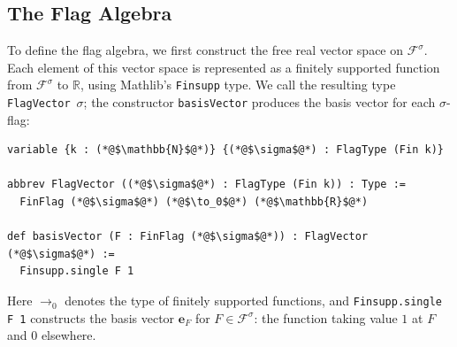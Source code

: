 \documentclass[acmsmall,screen=true,acmthm=false]{acmart}
\DeclareRobustCommand{\lean}[1]{{\def\_{\textunderscore\allowbreak}\texttt{#1}}}
\begin{document}
\subsection{The Flag Algebra}
\label{sec:formal-flag-algebra}

To define the flag algebra, we first construct the free real vector space on
$\mathcal{F}^\sigma$.  Each element of this vector space is represented as a
finitely supported function from $\mathcal{F}^\sigma$ to $\mathbb{R}$, using
Mathlib's \lean{Finsupp} type.  We call the resulting type
\lean{FlagVector}~$\sigma$; the constructor \lean{basisVector} produces the
basis vector for each $\sigma$-flag:
\begin{lstlisting}
variable {k : (*@$\mathbb{N}$@*)} {(*@$\sigma$@*) : FlagType (Fin k)}

abbrev FlagVector ((*@$\sigma$@*) : FlagType (Fin k)) : Type :=
  FinFlag (*@$\sigma$@*) (*@$\to_0$@*) (*@$\mathbb{R}$@*)

def basisVector (F : FinFlag (*@$\sigma$@*)) : FlagVector (*@$\sigma$@*) :=
  Finsupp.single F 1
\end{lstlisting}
Here $\to_0$ denotes the type of finitely supported functions, and \lean{Finsupp.single F 1} constructs the basis vector $\mathbf e_F$ for $F \in \mathcal{F}^\sigma$: the function taking value $1$ at $F$ and $0$ elsewhere.
\end{document}
